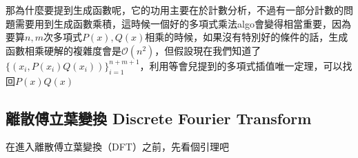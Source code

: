 那為什麼要提到生成函數呢，它的功用主要在於計數分析，不過有一部分計數的問題需要用到生成函數乘積，這時候一個好的多項式乘法algo會變得相當重要，因為要算$n,m$次多項式$P(x),Q(x)$相乘的時候，如果沒有特別好的條件的話，生成函數相乘硬解的複雜度會是$\mathcal{O}(n^2)$，但假設現在我們知道了$\{(x_i,P(x_i)Q(x_i))\}_{i=1}^{n+m+1}$，利用等會兒提到的多項式插值唯一定理，可以找回$P(x)Q(x)$


\newcommand{\pie}[1]{%
\begin{tikzpicture}
 \draw (0,0) circle (1ex);\fill (1ex,0) arc (0:#1:1ex) -- (0,0) -- cycle;
\end{tikzpicture}%
}


\subsection{離散傅立葉變換 Discrete Fourier Transform}
\label{sec:fft:dft}

在進入離散傅立葉變換（DFT）之前，先看個引理吧


